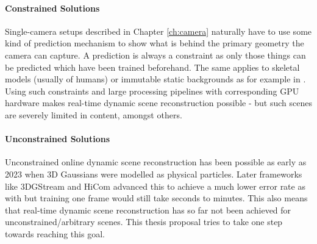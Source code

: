 \paragraph{Constrained Solutions} Single-camera setups described in Chapter \ref{ch:camera} naturally have to use some kind of prediction mechanism to show what is behind the primary geometry the camera can capture. A prediction is always a constraint as only those things can be predicted which have been trained beforehand. The same applies to skeletal models (usually of humans) or immutable static backgrounds as for example in \cite{huangEchoesColiseum3D2025}. Using such constraints and large processing pipelines with corresponding GPU hardware makes real-time dynamic scene reconstruction possible - but such scenes are severely limited in content, amongst others.

\paragraph{Unconstrained Solutions} Unconstrained online dynamic scene reconstruction has been possible as early as 2023 \cite{luitenDynamic3DGaussians2024} when 3D Gaussians were modelled as physical particles. Later frameworks like 3DGStream \cite{sun3DGStreamOntheFlyTraining2024} and HiCom \cite{gaoHiCoMHierarchicalCoherent2024} advanced this to achieve a much lower error rate as with \cite{luitenDynamic3DGaussians2024} but training one frame would still take seconds to minutes. This also means that real-time dynamic scene reconstruction has so far not been achieved for unconstrained/\allowbreak arbitrary scenes. This thesis proposal tries to take one step towards reaching this goal.

